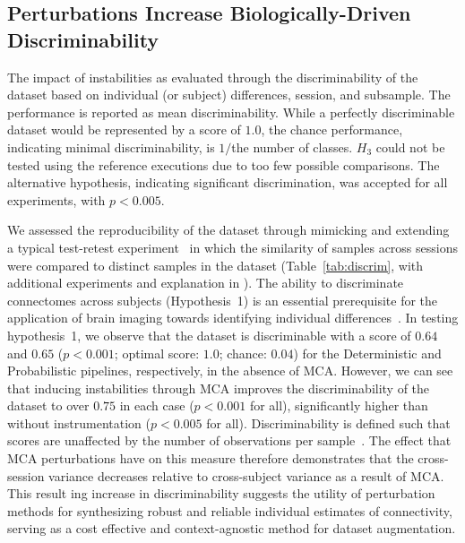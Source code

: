 \documentclass[fleqn,10pt]{SelfArx} %
\newcommand{\new}[1]{{\color{blue} #1}}
\begin{document}
\subsection*{\new{Perturbations Increase Biologically-Driven Discriminability}}
\begin{table}[ht]\centering
\caption{The impact of instabilities as evaluated through the \new{discriminability} of the dataset based on individual (or
subject) differences, session, and subsample. The performance is reported as mean discriminability. While a perfectly
\new{discriminable} dataset would be represented by a score of $1.0$, the chance performance, indicating minimal \new{discriminability}, is
$1 /$the number of classes. $H_3$ could not be tested using the reference executions due to too few possible
comparisons. The alternative hypothesis, indicating significant \new{discrimination}, was accepted for all experiments, with
$p < 0.005$.}
\vspace{5pt}

\label{tab:discrim}
\end{table}

We assessed the reproducibility of the dataset through mimicking and extending a typical test-retest
experiment~\cite{bridgeford2020elim} in which the similarity of samples across \new{sessions} were
compared to distinct samples in the dataset (Table~\ref{tab:discrim}, with additional experiments and explanation in
). The ability to \new{discriminate} connectomes across subjects (Hypothesis~1) is an essential
prerequisite for the application of brain imaging towards identifying individual differences~\cite{Dubois2016-yr}. In
testing hypothesis~1, we observe that the dataset is \new{discriminable} with a score of $0.64$ and $0.65$ ($p < 0.001$; optimal
score: $1.0$; chance: $0.04$) \new{for the Deterministic and Probabilistic pipelines, respectively, in the absence of MCA}.
However, we can see that inducing instabilities through MCA improves the \new{discriminability} of the dataset to over
$0.75$ in each case ($p < 0.001$ for all), significantly higher than without instrumentation ($p < 0.005$ for all).
\new{Discriminability is defined such that scores are unaffected by the number of observations per
sample~\cite{bridgeford2020elim}. The effect that MCA perturbations have on this measure therefore demonstrates that
the cross-session variance decreases relative to cross-subject variance as a result of MCA}.
This result\new{ing increase in discriminability} suggests the utility of perturbation methods for
synthesizing robust and reliable individual estimates of connectivity, serving as a cost effective and context-agnostic
method for dataset augmentation.
\end{document}
